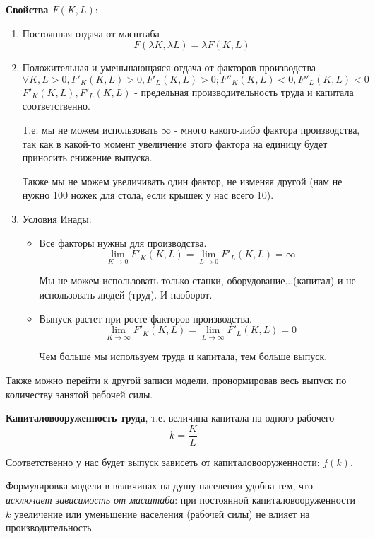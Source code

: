 \documentclass[reqno]{article}
\theoremstyle{definition}
\theoremstyle{definition}
\theoremstyle{definition}
\theoremstyle{definition}
\theoremstyle{definition}
\theoremstyle{definition}
\theoremstyle{definition}
\theoremstyle{definition}
\theoremstyle{definition}
\begin{document}
		\textbf{Свойства $F(K,L)$}:
		\begin{enumerate}
			\item Постоянная отдача от масштаба 
			$$F(\lambda K, \lambda L) = \lambda F(K, L)$$
			
			\item Положительная и уменьшающаяся отдача от факторов производства
			$$\forall K,L > 0, F'_K (K, L) > 0, F'_L (K, L) > 0; F''_K (K, L) < 0, F''_L (K, L) < 0 $$
			$F'_K (K, L), F'_L (K, L)$ - предельная производительность труда и капитала соответственно.
			
			Т.е. мы не можем использовать $\infty$ - много какого-либо фактора производства, так как в какой-то момент увеличение этого фактора на единицу будет приносить снижение выпуска.
			
			Также мы не можем увеличивать один фактор, не изменяя другой (нам не нужно 100 ножек для стола, если крышек у нас всего 10).
			
			\item Условия Инады:
			\begin{itemize}
				\item Все факторы нужны для производства.
				$$\lim_{K \rightarrow 0} F'_K (K, L) = \lim_{L \rightarrow 0} F'_L (K, L) = \infty$$
				
				Мы не можем использовать только станки, оборудование...(капитал) и не использовать людей (труд). И наоборот.
				
				\item Выпуск растет при росте факторов производства.
				$$\lim_{K \rightarrow \infty} F'_K (K, L) = \lim_{L \rightarrow \infty} F'_L (K, L) = 0$$
				
				Чем больше мы используем труда и капитала, тем больше выпуск.
			\end{itemize}
		\end{enumerate}
		
		Также можно перейти к другой записи модели, пронормировав весь выпуск по количеству занятой рабочей силы.
		
		\textbf{Капиталовооруженность труда}, т.е. величина капитала на одного рабочего $$k=\frac{K}{L}$$
		
		Соответственно у нас будет выпуск зависеть от капиталовооруженности: $f(k)$.
		
		Формулировка модели в величинах на душу населения удобна тем, что \emph{исключает зависимость от масштаба}: при постоянной капиталовооруженности $k$ увеличение или уменьшение населения (рабочей силы) не влияет на производительность.
		
\end{document}

